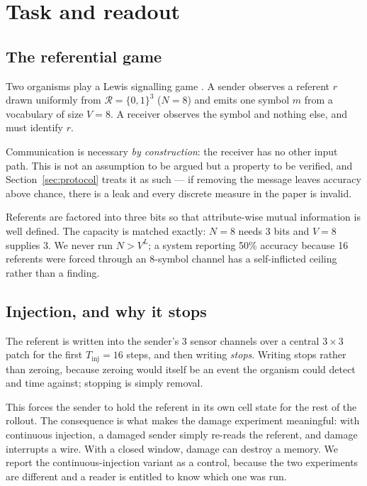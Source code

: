 \section{Task and readout}
\label{sec:task}

\subsection{The referential game}

Two organisms play a Lewis signalling game \citep{lewis1969convention}. A sender
observes a referent $r$ drawn uniformly from $\mathcal{R} = \{0,1\}^3$ ($N=8$)
and emits one symbol $m$ from a vocabulary of size $V=8$. A receiver observes the
symbol and nothing else, and must identify $r$.

Communication is necessary \emph{by construction}: the receiver has no other
input path. This is not an assumption to be argued but a property to be verified,
and Section~\ref{sec:protocol} treats it as such --- if removing the message
leaves accuracy above chance, there is a leak and every discrete measure in the
paper is invalid.

Referents are factored into three bits so that attribute-wise mutual information
is well defined. The capacity is matched exactly: $N=8$ needs 3 bits and $V=8$
supplies 3. We never run $N > V^L$; a system reporting 50\% accuracy because 16
referents were forced through an 8-symbol channel has a self-inflicted ceiling
rather than a finding.

\subsection{Injection, and why it stops}

The referent is written into the sender's 3 sensor channels over a central
$3\times3$ patch for the first $T_{\mathrm{inj}} = 16$ steps, and then writing
\emph{stops}. Writing stops rather than zeroing, because zeroing would itself be
an event the organism could detect and time against; stopping is simply removal.

This forces the sender to hold the referent in its own cell state for the rest of
the rollout. The consequence is what makes the damage experiment meaningful: with
continuous injection, a damaged sender simply re-reads the referent, and damage
interrupts a wire. With a closed window, damage can destroy a memory. We report
the continuous-injection variant as a control, because the two experiments are
different and a reader is entitled to know which one was run.

